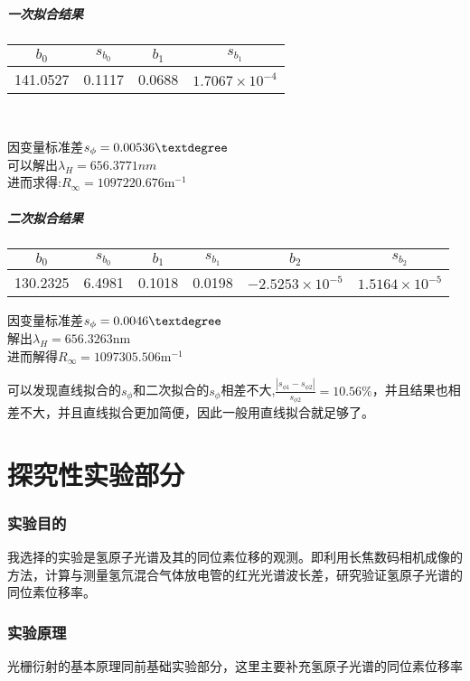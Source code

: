 \documentclass[10pt,a4paper,nocap]{ctexart}
\begin{document}
	\subsubsection{一次拟合结果}
\begin{center}
		\begin{tabular}{|c|c|c|c|}\hline
		\(b_0\)& \(s_{b_0}\) & \(b_1\) & \(s_{b_1}\) \\ \hline
		 141.0527 & 0.1117 & 0.0688  & \(1.7067\times10^{-4}\) \\ \hline
	\end{tabular}\\
\end{center}
	 因变量标准差\(s_\phi =0.00536\textdegree\)\\
	 可以解出\(\lambda_H = 656.3771nm\)\\
	 进而求得:\(R_\infty = 1097220.676 \mathrm{m}^{-1}\)
	 
\subsubsection{二次拟合结果}
\begin{center}
	\begin{tabular}{|c|c|c|c|c|c|} \hline
		\(b_0\) & \(s_{b_0}\) & \(b_1\) & \(s_{b_1}\) &\(b_2\) & \(s_{b_2}\) \\ \hline
		130.2325 & 6.4981 & 0.1018 & 0.0198 & \(-2.5253\times10^{-5}\) & \(1.5164\times10^{-5}\)\\ \hline
	\end{tabular}
\end{center}
因变量标准差\(s_\phi = 0.0046\textdegree\)\\
解出\(\lambda_H = 656.3263\mathrm{nm}\)\\
进而解得\(R_\infty = 1097305.506\mathrm{m}^{-1}\)

可以发现直线拟合的\(s_\phi\)和二次拟合的\(s_\phi\)相差不大,\(\displaystyle \frac{|s_{\phi1} - s_{\phi2}|}{s_{\phi2}} = 10.56 \%\)，并且结果也相差不大，并且直线拟合更加简便，因此一般用直线拟合就足够了。
\part{探究性实验部分}
\section{实验目的}
我选择的实验是氢原子光谱及其的同位素位移的观测。即利用长焦数码相机成像的方法，计算与测量氢氘混合气体放电管的红光光谱波长差，研究验证氢原子光谱的同位素位移率。
\section{实验原理}
光栅衍射的基本原理同前基础实验部分，这里主要补充氢原子光谱的同位素位移率
\subsection{}
\end{document}
